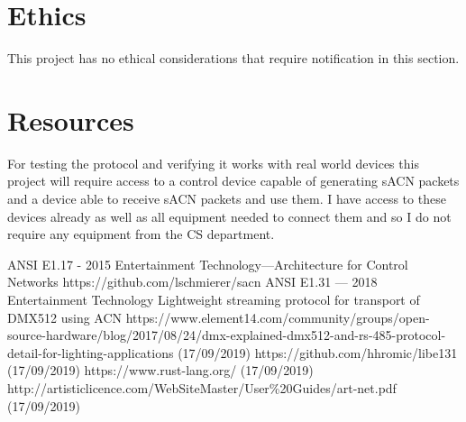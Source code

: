 \documentclass[12pt,a4paper,notitlepage]{report}
\begin{document}
\section*{Ethics}
This project has no ethical considerations that require notification in this section.

\section*{Resources}
For testing the protocol and verifying it works with real world devices this project will require access to a control device capable of generating sACN packets and a device able to receive sACN packets and use them. I have access to these devices already as well as all equipment needed to connect them and so I do not require any equipment from the CS department. 
	
\begin{thebibliography}{9}
	ANSI E1.17 - 2015 Entertainment Technology—Architecture for Control Networks
	https://github.com/lschmierer/sacn
	ANSI E1.31 — 2018 Entertainment Technology Lightweight streaming protocol for transport of DMX512 using ACN
	https://www.element14.com/community/groups/open-source-hardware/blog/2017/08/24/dmx-explained-dmx512-and-rs-485-protocol-detail-for-lighting-applications (17/09/2019)
	https://github.com/hhromic/libe131 (17/09/2019)
	https://www.rust-lang.org/ (17/09/2019)
	http://artisticlicence.com/WebSiteMaster/User\%20Guides/art-net.pdf (17/09/2019)
	
	
\end{thebibliography}
\end{document}
